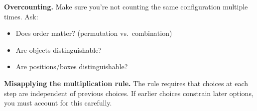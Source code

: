 \begin{commonmistake}
\textbf{Overcounting.} Make sure you're not counting the same configuration multiple times. Ask:
\begin{itemize}
  \item Does order matter? (permutation vs.\ combination)
  \item Are objects distinguishable?
  \item Are positions/boxes distinguishable?
\end{itemize}
\end{commonmistake}

\begin{commonmistake}
\textbf{Misapplying the multiplication rule.} The rule requires that choices at each step are independent of previous choices. If earlier choices constrain later options, you must account for this carefully.
\end{commonmistake}

